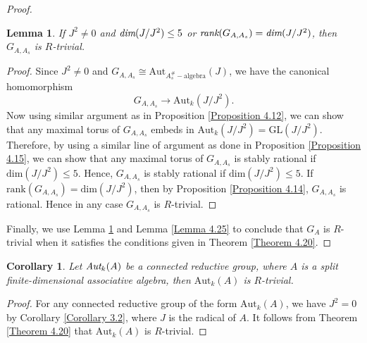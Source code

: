 \documentclass[12pt]{amsart}
\newtheorem{lemma}[theorem]{Lemma}
\newtheorem{corollary}[theorem]{Corollary}
\theoremstyle{definition}
\numberwithin{equation}{section}
\begin{document}
\begin{proof}
\vskip2mm

\begin{lemma}\label{Lemma 4.26}
If $J^2\neq 0$ and $\emph{dim}(J/J^2)\leq 5$ or $\emph{rank}(G_{A,A_s})=\emph{dim}(J/J^2)$, then $G_{A,A_s}$ is $R$-trivial.
\end{lemma}
\vskip1mm
\begin{proof} Since $J^2\neq 0$ and $G_{A,A_s}\cong \text{Aut}_{{A_s^{\#}}-\text{algebra}}(J)$, we have the canonical homomorphism \[G_{A,A_s}\rightarrow \text{Aut}_k(J/J^2).\] Now using similar argument as in Proposition \ref{Proposition 4.12}, we can show that any maximal torus of $G_{A,A_s}$ embeds in $\text{Aut}_k(J/J^2)=\text{GL}(J/J^2)$. Therefore, by using a similar line of argument as done in Proposition \ref{Proposition 4.15}, we can show that any maximal torus of $G_{A, A_s}$ is stably rational if $\text{dim}(J/J^2)\leq 5$. Hence, $G_{A, A_s}$ is stably rational if $\text{dim}(J/J^2)\leq 5$. If $\text{rank}(G_{A,A_s})=\text{dim}(J/J^2)$, then by Proposition \ref{Proposition 4.14}, $G_{A,A_s}$ is rational. Hence in any case $G_{A,A_s}$ is $R$-trivial.
\end{proof}
\vskip2mm
\noindent
Finally, we use Lemma \ref{Lemma 4.26} and Lemma \ref{Lemma 4.25}  to conclude that $G_A$ is $R$-trivial when it satisfies the conditions given in Theorem \ref{Theorem 4.20}.
\end{proof}

\vskip2mm
\begin{corollary}\label{Corollary 4.27}
Let $\emph{\text{Aut}}_k(A)$ be a connected reductive group, where $A$ is a split finite-dimensional associative algebra, then $\mathrm{Aut}_k(A)$ is $R$-trivial.
\end{corollary}
\vskip1mm
\begin{proof}
For any connected reductive group of the form $\text{Aut}_k(A)$, we have $J^2=0$ by Corollary \ref{Corollary 3.2}, where $J$ is the radical of $A$. It follows from Theorem \ref{Theorem 4.20} that $\text{Aut}_k(A)$ is $R$-trivial.
\end{proof}
\end{document}
